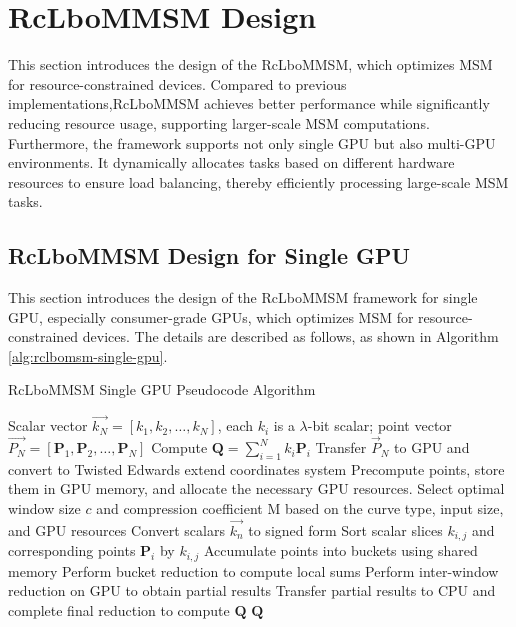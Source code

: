 \documentclass[conference]{IEEEtran}
\begin{document}
\section{RcLboMMSM Design}
\label{RcLboMMSM Design}
This section introduces the design of the RcLboMMSM, which optimizes MSM for resource-constrained devices. Compared to previous implementations,RcLboMMSM achieves better performance while significantly reducing resource usage, supporting larger-scale MSM computations. Furthermore, the framework supports not only single GPU but also multi-GPU environments. It dynamically allocates tasks based on different hardware resources to ensure load balancing, thereby efficiently processing large-scale MSM tasks.
\subsection{RcLboMMSM Design for Single GPU}
This section introduces the design of the RcLboMMSM framework for single GPU, especially consumer-grade GPUs, which optimizes MSM for resource-constrained devices. The details are described as follows, as shown in Algorithm \ref{alg:rclbomsm-single-gpu}.

\begin{algorithm}
    \caption{RcLboMMSM Single GPU Pseudocode Algorithm}
    \label{alg:rclbomsm-single-gpu}
    \begin{algorithmic}[1]
    \REQUIRE Scalar vector $\overrightarrow{k_N} = [k_1, k_2, \ldots, k_N]$, each $k_i$ is a $\lambda$-bit scalar; point vector $\overrightarrow{P_N} = [\mathbf{P}_1, \mathbf{P}_2, \ldots, \mathbf{P}_N]$
    \ENSURE Compute $\mathbf{Q} = \sum_{i=1}^{N} k_i \mathbf{P}_i$
    \STATE Transfer $\overrightarrow{P}_N$ to GPU and convert to Twisted Edwards extend coordinates system
    \STATE Precompute points, store them in GPU memory, and allocate the necessary GPU resources.
    \STATE Select optimal window size $c$ and compression coefficient M based on the curve type, input size, and GPU resources
    \STATE Convert scalars $\overrightarrow{k_n}$ to signed form 
        \STATE Sort scalar slices $k_{i,j}$ and corresponding points $\mathbf{P}_i$ by $k_{i,j}$
        \STATE Accumulate points into buckets using shared memory 
        \STATE Perform bucket reduction to compute local sums 
    \ENDFOR
    \STATE Perform inter-window reduction on GPU to obtain partial results
    \STATE Transfer partial results to CPU and complete final reduction to compute $\mathbf{Q}$
    \RETURN $\mathbf{Q}$
    \end{algorithmic}
\end{algorithm}
\end{document}
